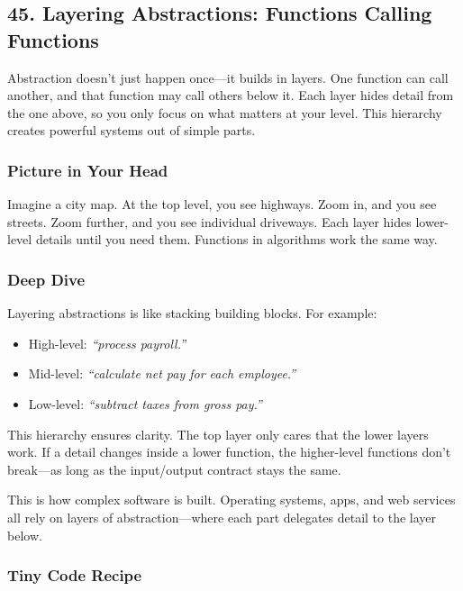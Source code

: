 \documentclass[
  letterpaper,
  DIV=11,
  numbers=noendperiod]{scrreprt}
\providecommand{\tightlist}{%
  \setlength{\itemsep}{0pt}\setlength{\parskip}{0pt}}
\begin{document}
\subsection{45. Layering Abstractions: Functions Calling
Functions}\label{layering-abstractions-functions-calling-functions}

Abstraction doesn't just happen once---it builds in layers. One function
can call another, and that function may call others below it. Each layer
hides detail from the one above, so you only focus on what matters at
your level. This hierarchy creates powerful systems out of simple parts.

\subsubsection{Picture in Your Head}\label{picture-in-your-head-44}

Imagine a city map. At the top level, you see highways. Zoom in, and you
see streets. Zoom further, and you see individual driveways. Each layer
hides lower-level details until you need them. Functions in algorithms
work the same way.

\subsubsection{Deep Dive}\label{deep-dive-14}

Layering abstractions is like stacking building blocks. For example:

\begin{itemize}
\tightlist
\item
  High-level: \emph{``process payroll.''}
\item
  Mid-level: \emph{``calculate net pay for each employee.''}
\item
  Low-level: \emph{``subtract taxes from gross pay.''}
\end{itemize}

This hierarchy ensures clarity. The top layer only cares that the lower
layers work. If a detail changes inside a lower function, the
higher-level functions don't break---as long as the input/output
contract stays the same.

This is how complex software is built. Operating systems, apps, and web
services all rely on layers of abstraction---where each part delegates
detail to the layer below.

\subsubsection{Tiny Code Recipe}\label{tiny-code-recipe-42}
\end{document}
